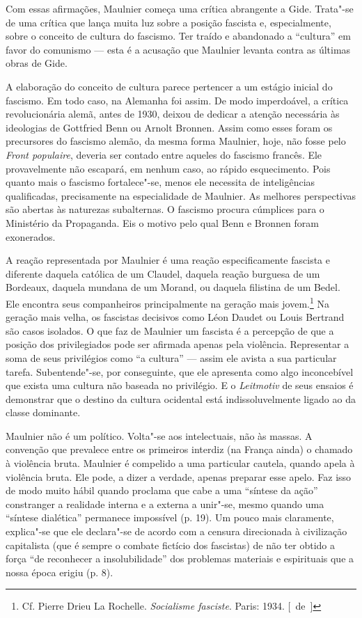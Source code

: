 Com essas afirmações, Maulnier começa uma crítica abrangente a Gide. Trata"-se de
uma crítica que lança muita luz sobre a posição fascista e,
especialmente, sobre o conceito de cultura do fascismo. Ter traído e
abandonado a ``cultura'' em favor do comunismo --- esta é a acusação que
Maulnier levanta contra as últimas obras de Gide.

A elaboração do conceito de cultura parece pertencer a um estágio
inicial do fascismo. Em todo caso, na Alemanha foi assim. De modo
imperdoável, a crítica revolucionária alemã, antes de 1930, deixou de
dedicar a atenção necessária às ideologias de Gottfried Benn ou Arnolt
Bronnen. Assim como esses foram os precursores do fascismo alemão, da mesma
forma Maulnier, hoje, não fosse pelo \emph{Front populaire}, deveria ser
contado entre aqueles do fascismo francês. Ele provavelmente não
escapará, em nenhum caso, ao rápido esquecimento. Pois quanto mais o
fascismo fortalece"-se, menos ele necessita de inteligências
qualificadas, precisamente na especialidade de Maulnier. As melhores
perspectivas são abertas às naturezas subalternas. O fascismo procura
cúmplices para o Ministério da Propaganda. Eis o motivo pelo qual Benn e Bronnen
foram exonerados.

A reação representada por Maulnier é uma reação especificamente fascista
e diferente daquela católica de um Claudel, daquela reação burguesa de
um Bordeaux, daquela mundana de um Morand, ou daquela filistina de um
Bedel. Ele encontra seus companheiros principalmente na geração mais
jovem.\footnote{Cf. Pierre Drieu La Rochelle. \emph{Socialisme
  fasciste}. Paris: 1934. [~de~]} Na geração mais velha, os fascistas
decisivos como Léon Daudet ou Louis Bertrand são casos isolados. O que
faz de Maulnier um fascista é a percepção de que a posição dos
privilegiados pode ser afirmada apenas pela violência. Representar a soma
de seus privilégios como ``a cultura'' --- assim ele avista a sua
particular tarefa. Subentende"-se, por conseguinte, que ele apresenta
como algo inconcebível que exista uma cultura não baseada no privilégio. E o
\emph{Leitmotiv} de seus ensaios é demonstrar que o destino da cultura
ocidental está indissoluvelmente ligado ao da classe dominante.

Maulnier não é um político. Volta"-se aos intelectuais, não às massas. A
convenção que prevalece entre os primeiros interdiz (na França ainda) o
chamado à violência bruta. Maulnier é compelido a uma particular cautela,
quando apela à violência bruta. Ele pode, a dizer a verdade, apenas
preparar esse apelo. Faz isso de modo muito hábil quando proclama que
cabe a uma ``síntese da ação'' constranger a realidade interna e a
externa a unir"-se, mesmo quando uma ``síntese dialética'' permanece impossível (p.
19). Um pouco mais claramente, explica"-se que ele declara"-se de acordo
com a censura direcionada à civilização capitalista (que é sempre o
combate fictício dos fascistas) de não ter obtido a força ``de reconhecer
a insolubilidade'' dos problemas materiais e espirituais que
a nossa época erigiu (p. 8).

